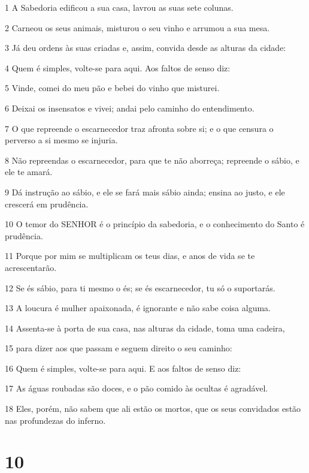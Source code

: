 \par 1 A Sabedoria edificou a sua casa, lavrou as suas sete colunas.
\par 2 Carneou os seus animais, misturou o seu vinho e arrumou a sua mesa.
\par 3 Já deu ordens às suas criadas e, assim, convida desde as alturas da cidade:
\par 4 Quem é simples, volte-se para aqui. Aos faltos de senso diz:
\par 5 Vinde, comei do meu pão e bebei do vinho que misturei.
\par 6 Deixai os insensatos e vivei; andai pelo caminho do entendimento.
\par 7 O que repreende o escarnecedor traz afronta sobre si; e o que censura o perverso a si mesmo se injuria.
\par 8 Não repreendas o escarnecedor, para que te não aborreça; repreende o sábio, e ele te amará.
\par 9 Dá instrução ao sábio, e ele se fará mais sábio ainda; ensina ao justo, e ele crescerá em prudência.
\par 10 O temor do SENHOR é o princípio da sabedoria, e o conhecimento do Santo é prudência.
\par 11 Porque por mim se multiplicam os teus dias, e anos de vida se te acrescentarão.
\par 12 Se és sábio, para ti mesmo o és; se és escarnecedor, tu só o suportarás.
\par 13 A loucura é mulher apaixonada, é ignorante e não sabe coisa alguma.
\par 14 Assenta-se à porta de sua casa, nas alturas da cidade, toma uma cadeira,
\par 15 para dizer aos que passam e seguem direito o seu caminho:
\par 16 Quem é simples, volte-se para aqui. E aos faltos de senso diz:
\par 17 As águas roubadas são doces, e o pão comido às ocultas é agradável.
\par 18 Eles, porém, não sabem que ali estão os mortos, que os seus convidados estão nas profundezas do inferno.

\chapter{10}

